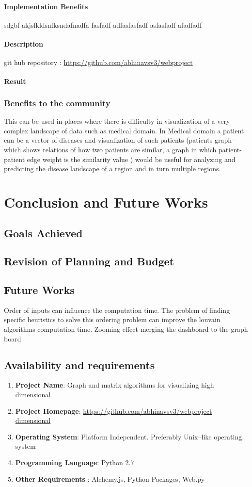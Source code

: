 \subsubsection{Implementation Benefits}
sdgbf akjsfkldsnfksndafnadfa
fasfadf
adfasfasfadf
asfasfadf
afadfadf
\subsubsection{Description}
git hub repository  : \url{https://github.com/abhinavsv3/webproject}
\subsubsection{Result}
\subsection{Benefits to the community}
This can be used in places where there is difficulty in visualization of a very complex landscape
of data such as medical domain. In Medical domain a patient can be a vector of diseases and
visualization of such patients (patients graph–which shows relations of how two patients are
similar, a graph in which patient-patient edge weight is the similarity value ) would be useful for
analyzing and predicting the disease landscape of a region and in turn multiple regions.

\chapter{Conclusion and Future Works}
\section{Goals Achieved}
\section{Revision of Planning and Budget}
\section{Future Works}
Order of inputs can influence the computation time. The problem of finding specific heuristics to solve this ordering problem can improve the louvain algorithms computation time.
Zooming effect
merging the dashboard to the graph board
\section{Availability and requirements}
\begin{enumerate}
\item \textbf{Project Name}: Graph and matrix algorithms for visualizing high dimensional
\item \textbf{Project Homepage}: \url{https://github.com/abhinavsv3/webproject dimensional}
\item \textbf{Operating System}: Platform Independent. Preferably Unix--like operating system
\item \textbf{Programming Language}: Python 2.7
\item \textbf{Other Requirements} : Alchemy.js, Python Packages, Web.py
\end{enumerate}

